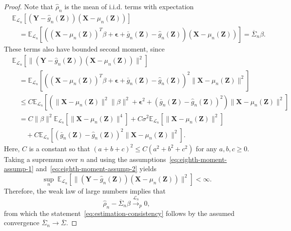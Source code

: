 \documentclass[ejs]{imsart}
\numberwithin{equation}{section}
\theoremstyle{plain}
\theoremstyle{definition}
\theoremstyle{remark}
\newcommand{\prx}{\bm X}
\newcommand{\prz}{\bm Z}
\newcommand{\pry}{{\bm Y}}
\newcommand{\peps}{\bm \epsilon}
\begin{document}
\begin{proof}

Note that $\widehat \rho_n$ is the mean of i.i.d. terms with expectation 
\begin{equation}
	\begin{split}
		&\mathbb E_{\mathcal L_n}[(\pry - \widehat g_n(\prz))(\prx - \mu_n(\prz))]  \\
		&\quad = \mathbb E_{\mathcal L_n}[((\prx - \mu_n(\prz))^T\beta + \peps + \bar g_n(\prz) - \widehat g_n(\prz))(\prx - \mu_n(\prz))] = \overline \Sigma_n \beta.
	\end{split}
\end{equation}
These terms also have bounded second moment, since
\begin{equation}
	\begin{split}
		&\mathbb E_{\mathcal L_n}[\|(\pry - \widehat g_n(\prz))(\prx - \mu_n(\prz))\|^2] \\
		&\quad= 	
		\mathbb E_{\mathcal L_n}[((\prx - \mu_n(\prz))^T\beta + \peps + \bar g_n(\prz) - \widehat g_n(\prz))^2\|\prx - \mu_n(\prz)\|^2] \\
		&\quad\leq
		C\mathbb E_{\mathcal L_n}[(\|\prx - \mu_n(\prz)\|^2\|\beta\|^2 + \peps^2 + (\bar g_n(\prz) - \widehat g_n(\prz))^2)\|\prx - \mu_n(\prz)\|^2] \\
		&\quad=
		C\|\beta\|^2\mathbb E_{\mathcal L_n}[\|\prx - \mu_n(\prz)\|^4] + C\sigma^2\mathbb E_{\mathcal L_n}[\|\prx - \mu_n(\prz)\|^2] \\
		&\quad \quad + C\mathbb E_{\mathcal L_n}[(\bar g_n(\prz) - \widehat g_n(\prz))^2\|\prx - \mu_n(\prz)\|^2].
	\end{split}
\end{equation}	
Here, $C$ is a constant so that $(a+b+c)^2 \leq C(a^2 + b^2 + c^2)$ for any $a, b, c \geq 0$.
Taking a supremum over $n$ and using the assumptions~\eqref{eq:eighth-moment-assump-1} and~\eqref{eq:eighth-moment-assump-2} yields
\begin{equation}
	\sup_n\ \mathbb E_{\mathcal L_n}[\|(\pry - \widehat g_n(\prz))(\prx - \mu_n(\prz))\|^2] < \infty.
\end{equation}
Therefore, the weak law of large numbers implies that
\begin{equation}
	\widehat \rho_n - \overline \Sigma_n \beta \overset{\mathcal L_n}\rightarrow _p  0,
\end{equation}
from which the statement~\eqref{eq:estimation-consistency} follows by the assumed convergence $\overline \Sigma_n \rightarrow \overline \Sigma$. 
	
\end{proof}
\end{document}
